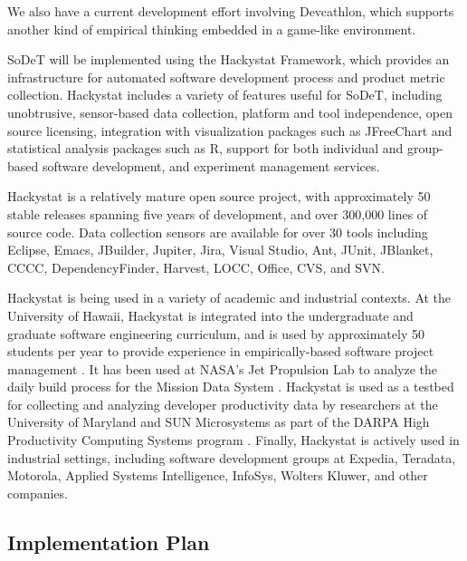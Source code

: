 We also have a current development effort involving Devcathlon, which supports another kind of empirical thinking embedded in a game-like environment. 

SoDeT will be implemented using the Hackystat Framework, which
provides an infrastructure for automated software development process and
product metric collection.  Hackystat includes a variety of features useful
for SoDeT, including unobtrusive, sensor-based data collection, 
platform and tool independence, open source licensing, integration with
visualization packages such as JFreeChart and statistical analysis packages
such as R, support for both individual and group-based software development, 
and experiment management services. 

Hackystat is a relatively mature open source project, with approximately 50
stable releases spanning five years of development, and over 300,000 lines
of source code. Data collection sensors are available for over 30 tools
including Eclipse, Emacs, JBuilder, Jupiter, Jira, Visual Studio, Ant,
JUnit, JBlanket, CCCC, DependencyFinder, Harvest, LOCC, Office, CVS, and
SVN.  

Hackystat is being used in a variety of academic and industrial contexts.
At the University of Hawaii, Hackystat is integrated into the undergraduate
and graduate software engineering curriculum, and is used by approximately
50 students per year to provide experience in empirically-based software
project management \cite{csdl2-03-12}. It has been used at NASA's Jet
Propulsion Lab to analyze the daily build process for the Mission Data
System \cite{csdl2-03-07}.  Hackystat is used as a testbed for collecting
and analyzing developer productivity data by researchers at the University
of Maryland and SUN Microsystems as part of the DARPA High Productivity
Computing Systems program \cite{Hochstein05,csdl2-04-03,csdl2-04-22}.
Finally, Hackystat is actively used in industrial settings, including
software development groups at Expedia, Teradata, Motorola, Applied Systems
Intelligence, InfoSys, Wolters Kluwer, and other companies.

\subsection{Implementation Plan}

